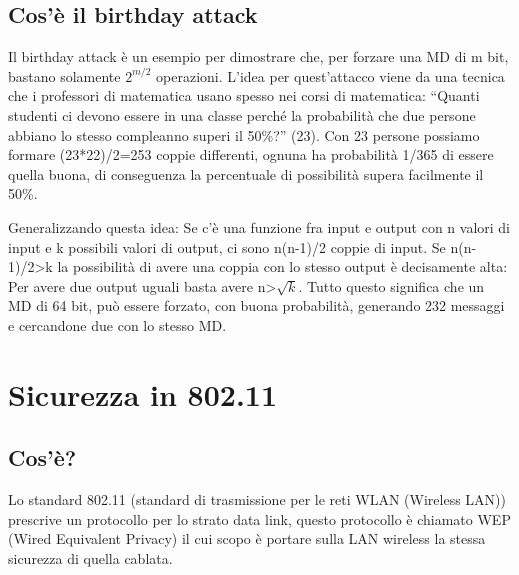 \subsection{Cos'è il birthday attack}
Il birthday attack è un esempio per dimostrare che, per forzare una MD di m bit, bastano solamente $2^{m/2}$ operazioni. L'idea per quest'attacco viene da una tecnica che i professori di matematica usano spesso nei corsi di matematica: “Quanti studenti ci devono essere in una classe perché la probabilità che due persone abbiano lo stesso compleanno superi il 50\%?” (23).
Con 23 persone possiamo formare (23*22)/2=253 coppie differenti, ognuna ha probabilità 1/365 di essere quella buona, di conseguenza la percentuale di possibilità supera facilmente il 50\%.

Generalizzando questa idea: Se c'è una funzione fra input e output con n valori di input e k possibili valori di output, ci sono n(n-1)/2 coppie di input. Se n(n-1)/2>k la possibilità di avere una coppia con lo stesso output è decisamente alta: Per avere due output uguali basta avere n>$\sqrt{k}$.
Tutto questo significa che un MD di 64 bit, può essere forzato, con buona probabilità, generando 232 messaggi e cercandone due con lo stesso MD.

\section{Sicurezza in 802.11}
\subsection{Cos'è?}
Lo standard 802.11 (standard di trasmissione per le reti WLAN (Wireless LAN)) prescrive un protocollo per lo strato data link, questo protocollo è chiamato WEP (Wired Equivalent Privacy) il cui scopo è portare sulla LAN wireless la stessa sicurezza di quella cablata.
